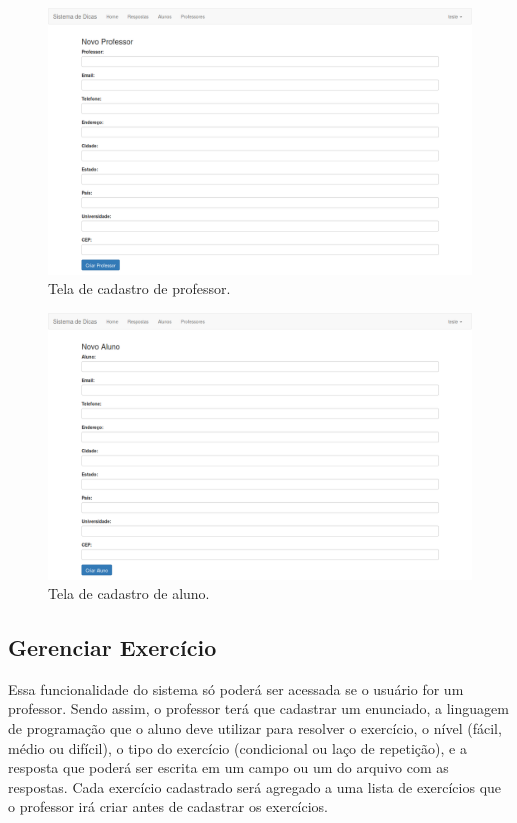 \begin{figure}[]
	\centering
	\captionsetup{justification=centering}
	\includegraphics[width=.8\linewidth]{imagenssoftware/cadastroprofessor.png}
	\caption{Tela de cadastro de professor.}
	\label{figura:cadastroprofessor}
\end{figure}

\begin{figure}[]		
	\centering
	\captionsetup{justification=centering}
	\includegraphics[width=.8\linewidth]{imagenssoftware/cadastroaluno.png}
	\caption{Tela de cadastro de aluno.}
	\label{figura:cadastroaluno}
\end{figure}
\frontmatter

\subsection{Gerenciar Exercício}

Essa funcionalidade do sistema só poderá ser acessada se o usuário for um professor. Sendo assim, o professor terá que cadastrar um enunciado, a linguagem de programação que o aluno deve utilizar para resolver o exercício, o nível (fácil, médio ou difícil), o tipo do exercício (condicional ou laço de repetição), e a resposta que poderá ser escrita em um campo ou um  do arquivo com as respostas. Cada exercício cadastrado será agregado a uma lista de exercícios que o professor irá criar antes de cadastrar os exercícios.

